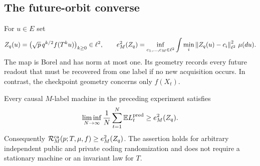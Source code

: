\subsection{The future-orbit converse}
For $u\in E$ set
\begin{equation}\label{eq:v3-orbit}
 Z_q(u)=\bigl(\sqrt p\,q^{k/2}f(T^ku)\bigr)_{k\ge0}\in\ell^2,
 \qquad
 e_M^2(Z_q)=\inf_{c_1,\ldots,c_M\in\ell^2}
   \int\min_i\left\lVert Z_q(u)-c_i\right\rVert_{\ell^2}^2\,\mu(du).
\end{equation}
The map is Borel and has norm at most one. Its geometry records every
future readout that must be recovered from one label if no new acquisition
occurs. In contrast, the checkpoint geometry concerns only $f(X_t)$.

\begin{theorem}
\label{thm:v3-orbit}
Every causal $M$-label machine in the preceding experiment satisfies
\begin{equation}\label{eq:v3-orbit-lower}
 \liminf_{N\to\infty}\frac1N\sum_{t=1}^N\mathbb E L_t^{\rm pred}
 \ge e_M^2(Z_q).
\end{equation}
Consequently $\mathcal R_M^{\rm ca}(p;T,\mu,f)\ge e_M^2(Z_q)$.
The assertion holds for arbitrary independent public and private coding
randomization and does not require a stationary machine or an invariant
law for $T$.
\end{theorem}

